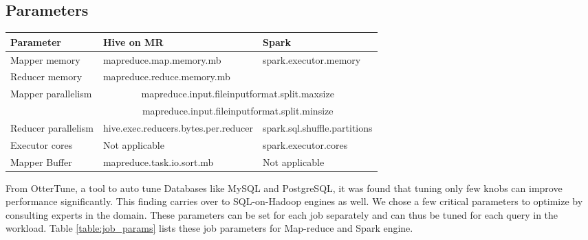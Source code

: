 \subsection{Parameters}


\begin{table*}
	\begin{tabular}{ |l|l|l| } 
		\hline
		Parameter & Hive on MR & Spark \\ 
		\hline
		Mapper memory & mapreduce.map.memory.mb & \multirow{2}{*}{spark.executor.memory} \\
		Reducer memory & mapreduce.reduce.memory.mb & \\
		\hline
		\multirow{2}{*}{Mapper parallelism} & \multicolumn{2}{|c|}{mapreduce.input.fileinputformat.split.maxsize} \\
		& \multicolumn{2}{|c|}{mapreduce.input.fileinputformat.split.minsize} \\
		\hline
		Reducer parallelism & hive.exec.reducers.bytes.per.reducer & spark.sql.shuffle.partitions \\
		\hline
		Executor cores & Not applicable & spark.executor.cores \\
		\hline
		Mapper Buffer & mapreduce.task.io.sort.mb & Not applicable \\
		\hline
	\end{tabular}
	\caption{Parameters of the Job to be optimized}
	\label{table:job_params}
\end{table*}


From OtterTune\cite{vanaken}, a tool to auto tune Databases like MySQL and PostgreSQL, it was found that tuning only few knobs can improve performance significantly. This finding carries over to SQL-on-Hadoop engines as well. We chose a few critical parameters to optimize by consulting experts in the domain. These parameters can be set for each job separately and can thus be tuned for each query in the workload. Table \ref{table:job_params} lists these job parameters for Map-reduce and Spark engine.


